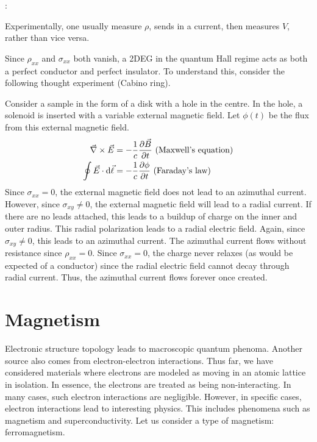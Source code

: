 \documentclass[12pt,a4paper,titlepage]{article}
\newcommand{\trm}[1]{\textrm{#1}} %
\newcommand{\ul}[1]{\underline{\smash{#1}}} %
\newcommand{\aside}[1]{%
	\ul{Aside}:\hfill
	\begin{minipage}[t]{\dimexpr\linewidth-8em\relax}
	#1
	\end{minipage}\hspace{4em}\bigskip
}
\begin{document}
\aside{Experimentally, one usually measure $\rho$, sends in a current, then measures $V$, rather than vice versa.}

Since $\rho_{xx}$ and $\sigma_{xx}$ both vanish, a 2DEG in the quantum Hall regime acts as both a perfect conductor and perfect insulator. To understand this, consider the following thought experiment (Cabino ring).
\begin{center}
\end{center}
Consider a sample in the form of a disk with a hole in the centre. In the hole, a solenoid is inserted with a variable external magnetic field. Let $\phi(t)$ be the flux from this external magnetic field.
\begin{equation}
\begin{aligned}
\vec{\nabla}\times\vec{E}&=-\frac{1}{c}\pdv{\vec{B}}{t}\trm{ (Maxwell's equation)}\\
\oint\vec{E}\cdot\dd{\vec{\ell}}&=-\frac{1}{c}\pdv{\phi}{t}\trm{ (Faraday's law)}
\end{aligned}
\end{equation}
Since $\sigma_{xx}=0$, the external magnetic field does not lead to an azimuthal current. However, since $\sigma_{xy}\neq 0$, the external magnetic field will lead to a radial current. If there are no leads attached, this leads to a buildup of charge on the inner and outer radius. This radial polarization leads to a radial electric field. Again, since $\sigma_{xy}\neq 0$, this leads to an azimuthal current. The azimuthal current flows without resistance since $\rho_{xx}=0$. Since $\sigma_{xx}=0$, the charge never relaxes (as would be expected of a conductor) since the radial electric field cannot decay through radial current. Thus, the azimuthal current flows forever once created.

\newpage
\section{Magnetism}
Electronic structure topology leads to macroscopic quantum phenoma. Another source also comes from electron-electron interactions. Thus far, we have considered materials where electrons are modeled as moving in an atomic lattice in isolation. In essence, the electrons are treated as being non-interacting. In many cases, such electron interactions are negligible. However, in specific cases, electron interactions lead to interesting physics. This includes phenomena such as magnetism and superconductivity. Let us consider a type of magnetism: ferromagnetism.
\end{document}
